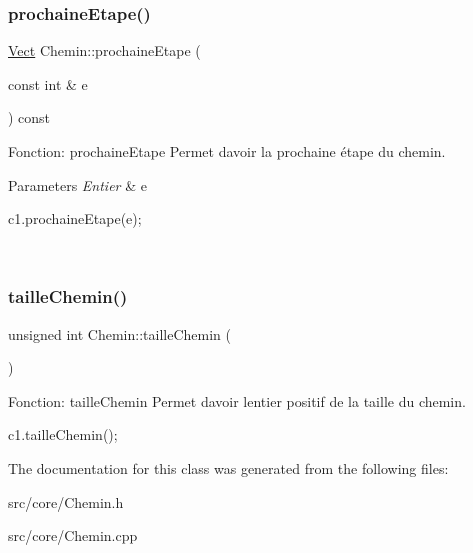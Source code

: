 \subsubsection{\texorpdfstring{prochaine\+Etape()}{prochaineEtape()}}
{\footnotesize\ttfamily \hyperlink{classVect}{Vect} Chemin\+::prochaine\+Etape (\begin{DoxyParamCaption}\item[{const int \&}]{e }\end{DoxyParamCaption}) const}



Fonction\+: prochaine\+Etape Permet d\textquotesingle{}avoir la prochaine étape du chemin. 


\begin{DoxyParams}{Parameters}
{\em Entier} & e 
\begin{DoxyCode}
c1.prochaineEtape(e);
\end{DoxyCode}
 \\
\hline
\end{DoxyParams}
\mbox{\label{classChemin_a7153e040b29f294f30793a698cde23b3}} 
\subsubsection{\texorpdfstring{taille\+Chemin()}{tailleChemin()}}
{\footnotesize\ttfamily unsigned int Chemin\+::taille\+Chemin (\begin{DoxyParamCaption}{ }\end{DoxyParamCaption})}



Fonction\+: taille\+Chemin Permet d\textquotesingle{}avoir l\textquotesingle{}entier positif de la taille du chemin. 


\begin{DoxyCode}
c1.tailleChemin();
\end{DoxyCode}
 

The documentation for this class was generated from the following files\+:\begin{DoxyCompactItemize}
\item 
src/core/Chemin.\+h\item 
src/core/Chemin.\+cpp\end{DoxyCompactItemize}
